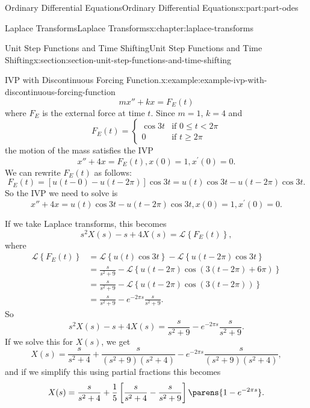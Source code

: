 \documentclass[twoside,10pt,]{book}
\numberwithin{equation}{part}
\newcommand{\Laplace}[1]{\mathcal{L}\left\{#1\right\}}
\newcommand{\lt}{<}
\newcommand{\amp}{&}
\begin{document}
\begin{partptx}{Ordinary Differential Equations}{}{Ordinary Differential Equations}{}{}{x:part:part-odes}
\begin{chapterptx}{Laplace Transforms}{}{Laplace Transforms}{}{}{x:chapter:laplace-transforms}
\begin{sectionptx}{Unit Step Functions and Time Shifting}{}{Unit Step Functions and Time Shifting}{}{}{x:section:section-unit-step-functions-and-time-shifting}
\begin{example}{IVP with Discontinuous Forcing Function.}{x:example:example-ivp-with-discontinuous-forcing-function}
\begin{equation*}
mx''+kx = F_{E}(t)
\end{equation*}
where \(F_{E}\) is the external force at time \(t\). Since \(m = 1\), \(k = 4\) and%
\begin{equation*}
F_{E}(t) = 
\begin{cases}
\cos3t \amp\text{if }0\leq t\lt 2\pi\\
0 \amp\text{if }t\geq2\pi  
\end{cases}
\end{equation*}
the motion of the mass satisfies the IVP%
\begin{equation*}
x''+4x = F_{E}(t), x(0) = 1, x^\prime(0) = 0.
\end{equation*}
We can rewrite \(F_{E}(t)\) as follows:%
\begin{equation*}
F_{E}(t) = [u(t-0)-u(t-2\pi)]\cos3t = u(t)\cos3t - u(t-2\pi)\cos3t.
\end{equation*}
So the IVP we need to solve is%
\begin{equation*}
x''+4x = u(t)\cos3t - u(t-2\pi)\cos3t, x(0) = 1, x^\prime(0) = 0.
\end{equation*}
%
\par
If we take Laplace transforms, this becomes%
\begin{equation*}
s^{2}X(s) - s + 4X(s) = \Laplace{F_{E}(t)},
\end{equation*}
where%
\begin{align*}
\Laplace{F_{E}(t)} \amp= \Laplace{u(t)\cos3t} - \Laplace{u(t-2\pi)\cos3t}\\
\amp= \frac{s}{s^{2}+9} - \Laplace{u(t-2\pi)\cos(3(t-2\pi)+6\pi)}\\
\amp= \frac{s}{s^{2}+9} - \Laplace{u(t-2\pi)\cos(3(t-2\pi))}\\
\amp= \frac{s}{s^{2}+9} - e^{-2\pi s}\frac{s}{s^{2}+9}\text{.}
\end{align*}
So%
\begin{equation*}
s^{2}X(s) - s + 4X(s) = \frac{s}{s^{2}+9} - e^{-2\pi s}\frac{s}{s^{2}+9}.
\end{equation*}
If we solve this for \(X(s)\), we get%
\begin{equation*}
X(s) = \frac{s}{s^{2}+4} + \frac{s}{(s^{2}+9)(s^{2}+4)} - e^{-2\pi s}\frac{s}{(s^{2}+9)(s^{2}+4)},
\end{equation*}
and if we simplify this using partial fractions this becomes%
\begin{equation*}
X(s) = \frac{s}{s^{2}+4} + \frac{1}{5}\left[\frac{s}{s^{2}+4} - \frac{s}{s^{2}+9}\right]\parens{1-e^{-2\pi s}}.

\end{equation*}
\end{example}
\end{sectionptx}
\end{chapterptx}
\end{partptx}
\end{document}
